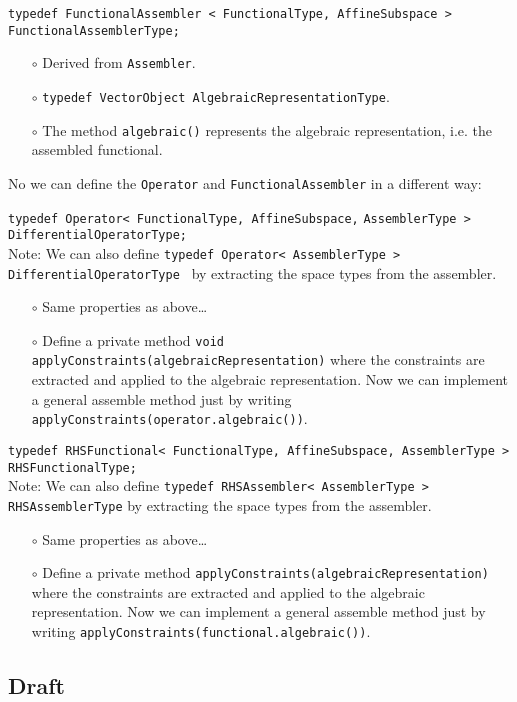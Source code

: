 \documentclass[a4paper,11pt]{article}
\numberwithin{equation}{section}
\newcommand{\CodeT}[1]{\textnormal{\texttt{#1}}}
\begin{document}
\noindent\CodeT{typedef FunctionalAssembler < FunctionalType, AffineSubspace >}\\
\CodeT{FunctionalAssemblerType;}
\begin{itemize}
	\item[$\circ$] Derived from \CodeT{Assembler}.
	\item[$\circ$] \CodeT{typedef VectorObject AlgebraicRepresentationType}.
	\item[$\circ$] The method \CodeT{algebraic()} represents the algebraic representation, i.e. the assembled functional.
\end{itemize}

\noindent No we can define the \CodeT{Operator} and \CodeT{FunctionalAssembler} in a different way:

\noindent\CodeT{typedef Operator< FunctionalType, AffineSubspace,}
\CodeT{AssemblerType > DifferentialOperatorType;}\\
Note: We can also define \CodeT{typedef Operator< AssemblerType > DifferentialOperatorType } by extracting the space types from the assembler.
\begin{itemize}
	\item[$\circ$] Same properties as above\ldots
	\item[$\circ$] Define a private method \CodeT{void applyConstraints(algebraicRepresentation)} where the constraints are extracted and applied to the algebraic representation. Now we can implement a general assemble method just by writing \CodeT{applyConstraints(operator.algebraic())}.
\end{itemize}

\noindent\CodeT{typedef RHSFunctional< FunctionalType, AffineSubspace, AssemblerType >}\\
\CodeT{RHSFunctionalType;}\\
Note: We can also define \CodeT{typedef RHSAssembler< AssemblerType > RHSAssemblerType} by extracting the space types from the assembler.
\begin{itemize}
	\item[$\circ$] Same properties as above\ldots
	\item[$\circ$] Define a private method \CodeT{applyConstraints(algebraicRepresentation)} where the constraints are extracted and applied to the algebraic representation. Now we can implement a general assemble method just by writing \CodeT{applyConstraints(functional.algebraic())}.
\end{itemize}

\subsection{Draft}
\end{document}
